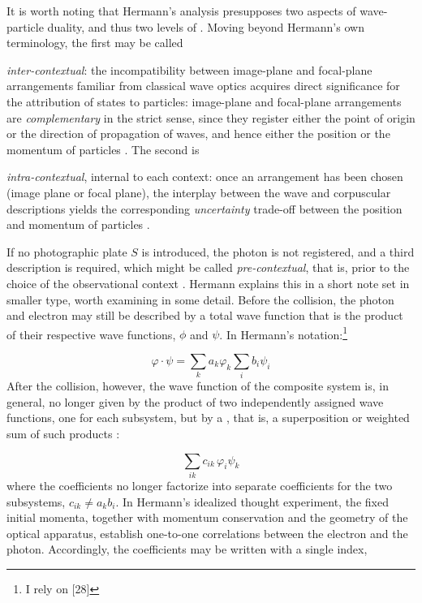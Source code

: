 \documentclass[pdflatex]{sn-jnl}
\newcommand{\NGQ}[2]{\citep[#1/#2]{Hermann1935}}
\begin{document}
%
It is worth noting that Hermann’s analysis presupposes two aspects of wave-particle duality, and thus two levels of . Moving beyond Hermann’s own terminology, the first may be called \begin{inparaenum}[(a)]
\item \emph{inter-contextual}: the incompatibility between image-plane and focal-plane arrangements familiar from classical wave optics acquires direct significance for the attribution of states to particles: image-plane and focal-plane arrangements are \emph{complementary} in the strict sense, since they register either the point of origin or the direction of propagation of waves, and hence either the position or the momentum of particles \NGQ{128}{284}. The second is \item \emph{intra-contextual}, internal to each context: once an arrangement has been chosen (image plane or focal plane), the interplay between the wave and corpuscular descriptions yields the corresponding \emph{uncertainty} trade-off between the position and momentum of particles \NGQ{129}{284}. \end{inparaenum}

If no photographic plate $S$ is introduced, the photon is not registered, and a third description is required, which might be called \emph{pre-contextual}, that is, prior to the choice of the observational context \NGQ{135}{258}. Hermann explains this in a short note set in smaller type, worth examining in some detail. Before the collision, the photon and electron may still be described by a total wave function that is the product of their respective wave functions, $\phi$ and $\psi$. In Hermann's notation:\footnote{I rely on [28]}

\begin{equation*}
\varphi\cdot\psi=\sum_k a_k \varphi_k \sum_i b_i \psi_i
\end{equation*}
%
After the collision, however, the wave function of the composite system is, in general, no longer given by the product of two independently assigned wave functions, one for each subsystem, but by a , that is, a superposition or weighted sum of such products \NGQ{113}{258}:

\begin{equation*}
\sum_{ik} c_{ik}\,\varphi_i\psi_k
\end{equation*}
%
where the coefficients no longer factorize into separate coefficients for the two subsystems, $c_{ik} \neq a_k b_i$. In Hermann's idealized thought experiment, the fixed initial momenta, together with momentum conservation and the geometry of the optical apparatus, establish one-to-one correlations between the electron and the photon. Accordingly, the coefficients may be written with a single index,
\end{document}
